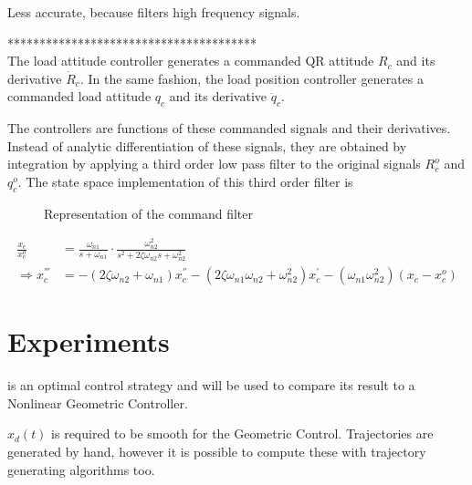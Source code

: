 Less accurate, because filters high frequency signals.

***************************************\\

The load attitude controller generates a commanded QR attitude $ R_c $ and its derivative $ \dot{R}_c $. In the same fashion, the load position controller generates a commanded load attitude $ q_c $ and its derivative $ \dot{q}_c $. 

The controllers are functions of these commanded signals and their derivatives. Instead of analytic differentiation of these signals, they are obtained by integration by applying a third order low pass filter to the original signals $ R_c^o $ and $ q_c^o $. 
The state space implementation of this third order filter is \cite{Djapic2008}


\begin{figure}[h!]
	\centering
	\caption{Representation of the command filter\label{fig:set.CF}}
\end{figure}		

\begin{align}\label{eq:CF}
\frac{x_c}{x_c^o}&=\frac{\omega_{n1}}{s+\omega_{n1}}\cdot\frac{\omega_{n2}^2}{s^2+2\zeta\omega_{n2}s+\omega_{n2}^2}\\
\Rightarrow x_c^{'''}&=-(2\zeta\omega_{n2}+\omega_{n1})x_c^{''}-(2\zeta\omega_{n1}\omega_{n2}+\omega_{n2}^2)x_c^{'}-(\omega_{n1}\omega_{n2} ^2)(x_c-x_c^o)
\end{align}

\section{Experiments}\label{sec:set.exp}

 is an optimal control strategy and will be used to compare its result to a Nonlinear Geometric Controller.

$ x_d(t) $ is required to be smooth for the Geometric Control. Trajectories are generated by hand, however it is possible to compute these with trajectory generating algorithms too.

